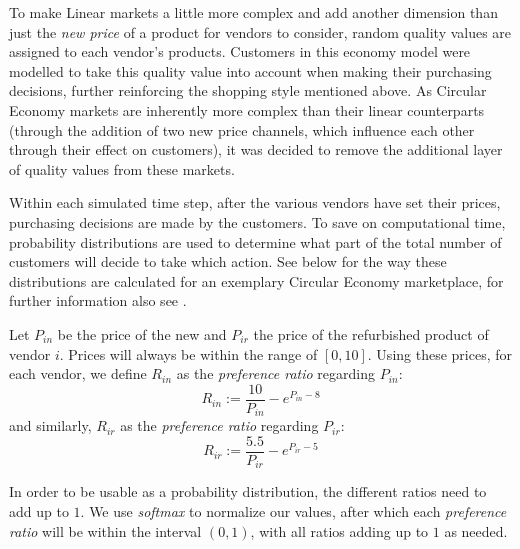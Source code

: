 To make Linear markets a little more complex and add another dimension than just the \emph{new price} of a product for vendors to consider, random quality values are assigned to each vendor's products. Customers in this economy model were modelled to take this quality value into account when making their purchasing decisions, further reinforcing the shopping style mentioned above. As Circular Economy markets are inherently more complex than their linear counterparts (through the addition of two new price channels, which influence each other through their effect on customers), it was decided to remove the additional layer of quality values from these markets.

Within each simulated time step, after the various vendors have set their prices, purchasing decisions are made by the customers. To save on computational time, probability distributions are used to determine what part of the total number of customers will decide to take which action. See below for the way these distributions are calculated for an exemplary Circular Economy marketplace, for further information also see \cite{NickThesis}.

\pagebreak
\begin{definition}\label{def:customerDecisions}
	Let \(P_{in}\) be the price of the new and \(P_{ir}\) the price of the refurbished product of vendor \(i\). Prices will always be within the range of \([0,10]\). Using these prices, for each vendor, we define \(R_{in}\) as the \emph{preference ratio} regarding \(P_{in}\):
	\[
		R_{in} := \frac{10}{P_{in}} - e^{P_{in} - 8}
	\]
	and similarly, \(R_{ir}\) as the \emph{preference ratio} regarding \(P_{ir}\):
	\[
		R_{ir} := \frac{5.5}{P_{ir}} - e^{P_{ir} - 5}
	\]
\end{definition}


In order to be usable as a probability distribution, the different ratios need to add up to \(1\). We use \emph{softmax} to normalize our values, after which each \emph{preference ratio} will be within the interval \((0,1)\), with all ratios adding up to \(1\) as needed.

